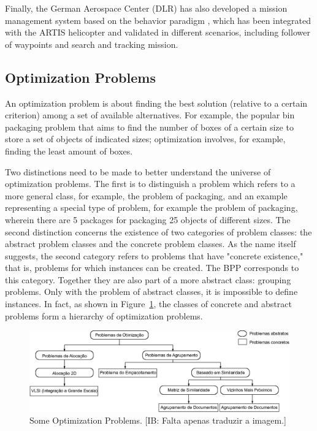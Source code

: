 \documentclass[conference,harvard,brazil,english]{sbatex}
\newcommand{\commentib}[1]{{\color{blue} [IB: #1]}}
\begin{document}
Finally, the German Aerospace Center (DLR) has also developed a mission management system based on the behavior paradigm \cite{adolf2010onboard}, which has been integrated with the ARTIS helicopter and validated in different scenarios, including follower of waypoints and search and tracking mission.


\subsection{Optimization Problems}

An optimization problem is about finding the best solution (relative to a certain criterion) among a set of available alternatives. For example, the popular bin packaging problem that aims to find the number of boxes of a certain size to store a set of objects of indicated sizes; optimization involves, for example, finding the least amount of boxes.

Two distinctions need to be made to better understand the universe of optimization problems. The first is to distinguish a problem which refers to a more general class, for example, the problem of packaging, and an example representing a special type of problem, for example the problem of packaging, wherein there are 5 packages for packaging 25 objects of different sizes. The second distinction concerns the existence of two categories of problem classes: the abstract problem classes and the concrete problem classes. As the name itself suggests, the second category refers to problems that have "concrete existence," that is, problems for which instances can be created. The BPP corresponds to this category. Together they are also part of a more abstract class: grouping problems. Only with the problem of abstract classes, it is impossible to define instances. In fact, as shown in Figure~\ref{fig:problemasDeOtimizacao}, the classes of concrete and abstract problems form a hierarchy of optimization problems.

\begin{figure}[h]
	\centering
	\includegraphics[width=1.0\textwidth]{problemasDeOtimizacao.eps}
	\caption{Some Optimization Problems.\commentib{Falta apenas traduzir a imagem.} \label{fig:problemasDeOtimizacao}}
	\end{figure}
	
\end{document}
